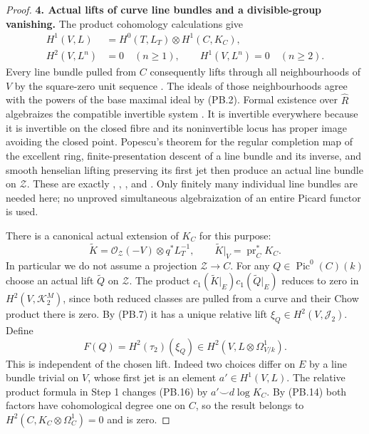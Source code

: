 \begin{proof}
\textbf{4. Actual lifts of curve line bundles and a divisible-group vanishing.}
The product cohomology calculations give
\[
 \begin{split}
 H^1(V,L)&=H^0(T,L_T)\otimes H^1(C,K_C),\\
 H^2(V,L^n)&=0\quad(n\ge1),\qquad
 H^1(V,L^n)=0\quad(n\ge2).
 \end{split}
 \tag{PB.14}
\]
Every line bundle pulled from $C$ consequently lifts through all
neighbourhoods of $V$ by the square-zero unit sequence
\citep[Lemma 37.4.1, Tag 0C6R]{frC3azStacksPicThickening}. The ideals of those neighbourhoods agree with
the powers of the base maximal ideal by (PB.2). Formal existence
over $\widehat R$ algebraizes the compatible invertible system
\citep[Lemma 30.24.3, Tag 0885]{frC3azStacksExistence}.
It is invertible everywhere because it is invertible on the closed
fibre and its noninvertible locus has proper image avoiding the
closed point. Popescu's theorem for the regular completion map of
the excellent ring, finite-presentation descent of a line bundle
and its inverse, and smooth henselian lifting preserving its first
jet then produce an actual line bundle on $\mathcal Z$.
These are exactly
\citet[Lemma 15.51.14, Tag 0AH2]{frC3azStacksCompletion},
\citet[Theorem 16.12.1, Tag 07GC]{frC3azStacksPopescu},
\citet[Lemma 32.10.3(2), Tag 0B8W]{frC3azStacksLimitBundles}, and
\citet[Lemma 15.13.3, Tag 0H74]{frC3azStacksHenselSmooth}.
Only finitely many individual line bundles are needed here; no
unproved simultaneous algebraization of an entire Picard functor
is used.

There is a canonical actual extension of $K_C$ for this purpose:
\[
 \widetilde K=\mathcal O_{\mathcal Z}(-V)\otimes q^*L_T^{-1},
 \qquad \widetilde K|_V=\operatorname{pr}_C^*K_C.
 \tag{PB.15}
\]
In particular we do not assume a projection $\mathcal Z\to C$.
For any $Q\in\operatorname{Pic}^0(C)(k)$ choose an actual lift
$\widetilde Q$ on $\mathcal Z$. The product
$c_1(\widetilde K|_E)c_1(\widetilde Q|_E)$ reduces to zero in
$H^2(V,\mathcal K_2^M)$, since both reduced classes are pulled from
a curve and their Chow product there is zero. By (PB.7) it has a
unique relative lift $\xi_Q\in H^2(V,\mathcal J_2)$.
Define
\[
 F(Q)=H^2(\tau_2)(\xi_Q)
                      \in H^2(V,L\otimes\Omega^1_{V/k}).
 \tag{PB.16}
\]
This is independent of the chosen lift. Indeed two choices differ
on $E$ by a line bundle trivial on $V$, whose first jet is an
element $a'\in H^1(V,L)$. The relative product formula in Step 1
changes (PB.16) by $a'\smile d\log K_C$. By (PB.14) both factors
have cohomological degree one on $C$, so the result belongs to
$H^2(C,K_C\otimes\Omega_C^1)=0$ and is zero.


\end{proof}
